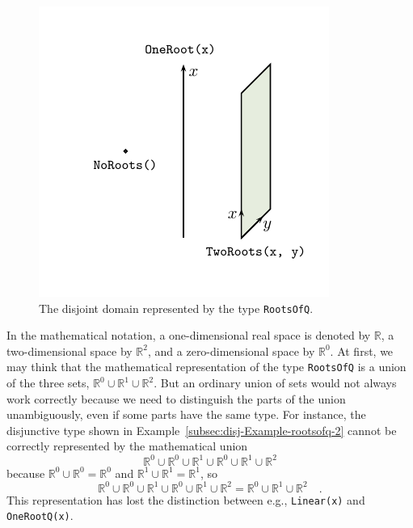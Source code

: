 \begin{figure}
\begin{centering}
\hspace{-1cm}\includegraphics[scale=1.2]{chapter3-picture}
\par\end{centering}
\vspace{-1.4\baselineskip}
\caption{The disjoint domain represented by the type \lstinline!RootsOfQ!.\label{fig:RootsOfQ-disjoint-domain}}
\end{figure}

In the mathematical notation, a one-dimensional real space is denoted
by $\mathbb{R}$, a two-dimensional space by $\mathbb{R}^{2}$, and
a zero-dimensional space by $\mathbb{R}^{0}$. At first, we may think
that the mathematical representation of the type \lstinline!RootsOfQ!
is a union of the three sets, $\mathbb{R}^{0}\cup\mathbb{R}^{1}\cup\mathbb{R}^{2}$.
But an ordinary union of sets would not always work correctly because
we need to distinguish the parts of the union unambiguously, even
if some parts have the same type. For instance, the disjunctive type
shown in Example~\ref{subsec:disj-Example-rootsofq-2} cannot be
correctly represented by the mathematical union
\[
\mathbb{R}^{0}\cup\mathbb{R}^{0}\cup\mathbb{R}^{1}\cup\mathbb{R}^{0}\cup\mathbb{R}^{1}\cup\mathbb{R}^{2}
\]
because $\mathbb{R}^{0}\cup\mathbb{R}^{0}=\mathbb{R}^{0}$ and $\mathbb{R}^{1}\cup\mathbb{R}^{1}=\mathbb{R}^{1}$,
so 
\[
\mathbb{R}^{0}\cup\mathbb{R}^{0}\cup\mathbb{R}^{1}\cup\mathbb{R}^{0}\cup\mathbb{R}^{1}\cup\mathbb{R}^{2}=\mathbb{R}^{0}\cup\mathbb{R}^{1}\cup\mathbb{R}^{2}\quad.
\]
This representation has lost the distinction between e.g., \lstinline!Linear(x)!
and \lstinline!OneRootQ(x)!.


